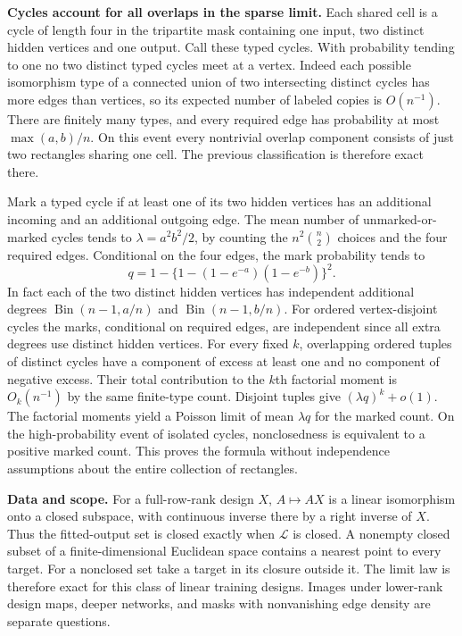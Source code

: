 \documentclass[10pt]{article}
\begin{document}
\textbf{Cycles account for all overlaps in the sparse limit.}
Each shared cell is a cycle of length four in the tripartite mask containing one input, two distinct hidden vertices and one output. Call these typed cycles. With probability tending to one no two distinct typed cycles meet at a vertex. Indeed each possible isomorphism type of a connected union of two intersecting distinct cycles has more edges than vertices, so its expected number of labeled copies is $O(n^{-1})$. There are finitely many types, and every required edge has probability at most $\max(a,b)/n$. On this event every nontrivial overlap component consists of just two rectangles sharing one cell. The previous classification is therefore exact there.

Mark a typed cycle if at least one of its two hidden vertices has an additional incoming and an additional outgoing edge. The mean number of unmarked-or-marked cycles tends to $\lambda=a^2b^2/2$, by counting the $n^2\binom n2$ choices and the four required edges. Conditional on the four edges, the mark probability tends to
\[
 q=1-\{1-(1-e^{-a})(1-e^{-b})\}^2.
\]
In fact each of the two distinct hidden vertices has independent additional degrees $\operatorname{Bin}(n-1,a/n)$ and $\operatorname{Bin}(n-1,b/n)$. For ordered vertex-disjoint cycles the marks, conditional on required edges, are independent since all extra degrees use distinct hidden vertices. For every fixed $k$, overlapping ordered tuples of distinct cycles have a component of excess at least one and no component of negative excess. Their total contribution to the $k$th factorial moment is $O_k(n^{-1})$ by the same finite-type count. Disjoint tuples give $(\lambda q)^k+o(1)$. The factorial moments yield a Poisson limit of mean $\lambda q$ for the marked count. On the high-probability event of isolated cycles, nonclosedness is equivalent to a positive marked count. This proves the formula without independence assumptions about the entire collection of rectangles.

\textbf{Data and scope.} For a full-row-rank design $X$, $A\mapsto AX$ is a linear isomorphism onto a closed subspace, with continuous inverse there by a right inverse of $X$. Thus the fitted-output set is closed exactly when $\mathcal L$ is closed. A nonempty closed subset of a finite-dimensional Euclidean space contains a nearest point to every target. For a nonclosed set take a target in its closure outside it. The limit law is therefore exact for this class of linear training designs. Images under lower-rank design maps, deeper networks, and masks with nonvanishing edge density are separate questions.
\end{document}
